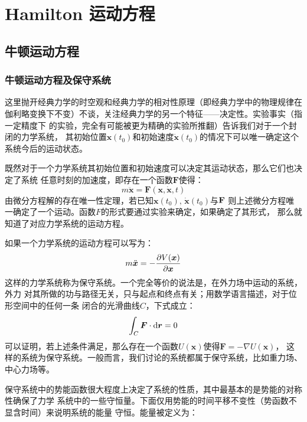 \chapter{Hamilton 运动方程}
    \section{牛顿运动方程}
    \subsection{牛顿运动方程及保守系统}
    \par
    这里抛开经典力学的时空观和经典力学的相对性原理（即经典力学中的物理规律在
    伽利略变换下不变）不谈，关注经典力学的另一个特征——决定性。实验事实（指一定精度下
    的实验，完全有可能被更为精确的实验所推翻）告诉我们对于一个封闭的力学系统，
    其初始位置$\bm{x}(t_0)$和初始速度$\dot{\bm{x}}(t_0)$的情况下可以唯一确定这个
    系统今后的运动状态。
    \par 既然对于一个力学系统其初始位置和初始速度可以决定其运动状态，那么它们也决定了系统
    任意时刻的加速度，即存在一个函数$\bm{F}$使得：
    \begin{equation}
        m\ddot{\bm{x}} = \bm{F}(\bm{x}, \dot{\bm{x}}, t)
    \end{equation}
    由微分方程解的存在唯一性定理，若已知$\bm{x}(t_0),\, \dot{\bm{x}}(t_0)$与$\mathbf{F}$
    则上述微分方程唯一确定了一个运动。函数$F$的形式要通过实验来确定，如果确定了其形式，
    那么就知道了对应力学系统的运动方程。
    \par 如果一个力学系统的运动方程可以写为：
    \begin{equation}
        m\ddot{\bm{x}} = -\frac{\partial{V(\bm{x})}}{\partial{\bm{x}}}
    \end{equation}
    这样的力学系统称为保守系统。一个完全等价的说法是，在外力场中运动的系统，外力
    对其所做的功与路径无关，只与起点和终点有关；用数学语言描述，对于位形空间中的任何一条
    闭合的光滑曲线$C$，下式成立：
    \begin{equation}
        \int_{C}\bm{F}\cdot\mathrm{d} \bm{r} = 0
    \end{equation}
    可以证明，若上述条件满足，那么存在一个函数$U(\bm{x})$使得$\bm{F} = -\nabla U(\bm{x})$，
    这样的系统为保守系统。一般而言，我们讨论的系统都属于保守系统，比如重力场、中心力场等。
    \par 
    保守系统中的势能函数很大程度上决定了系统的性质，其中最基本的是势能的对称性确保了力学
    系统中的一些守恒量。下面仅用势能的时间平移不变性（势函数不显含时间）来说明系统的能量
    守恒。能量被定义为：

